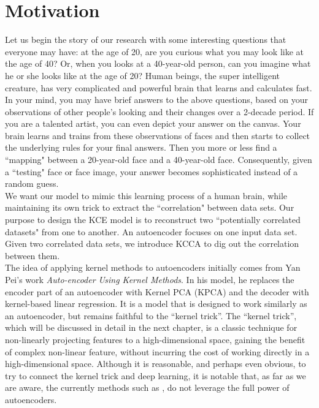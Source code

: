 \documentclass[12pt]{report} %
\begin{document}
\section{Motivation}
Let us begin the story of our research with some interesting questions that everyone may have: at the age of 20, are you curious what you may look like at the age of 40? Or, when you looks at a 40-year-old person, can you imagine what he or she looks like at the age of 20? Human beings, the super intelligent creature, has very complicated and powerful brain that learns and calculates fast. In your mind, you may have brief answers to the above questions, based on your observations of other people's looking and their changes over a 2-decade period. If you are a talented artist, you can even depict your answer on the canvas. Your brain learns and trains from these observations of faces and then starts to collect the underlying rules for your final answers. Then you more or less find a ``mapping" between a 20-year-old face and a 40-year-old face. Consequently, given a ``testing" face or face image, your answer becomes sophisticated instead of a random guess.\\
We want our model to mimic this learning process of a human brain, while maintaining its own trick to extract the ``correlation" between data sets. Our purpose to design the KCE model is to reconstruct two ``potentially correlated datasets" from one to another. An autoencoder focuses on one input data set. Given two correlated data sets, we introduce KCCA to dig out the correlation between them. \\
The idea of applying kernel methods to autoencoders initially comes from Yan Pei's work \textit{Auto-encoder Using Kernel Methods}\cite{AUKM}. In his model, he replaces the encoder part of an autoencoder with Kernel PCA (KPCA)\cite{KPCA} and the decoder with kernel-based linear regression. It is a model that is designed to work similarly as an autoencoder, but remains faithful to the ``kernel trick''. The ``kernel trick'', which will be discussed in detail in the next chapter, is a classic technique for non-linearly projecting features to a high-dimensional space, gaining the benefit of complex non-linear feature, without incurring the cost of working directly in a high-dimensional space. Although it is reasonable, and perhaps even obvious, to try to connect the kernel trick and deep learning, it is notable that, as far as we are aware, the currently methods such as \cite{AUKM}, do not leverage the full power of autoencoders.\\
\end{document}
